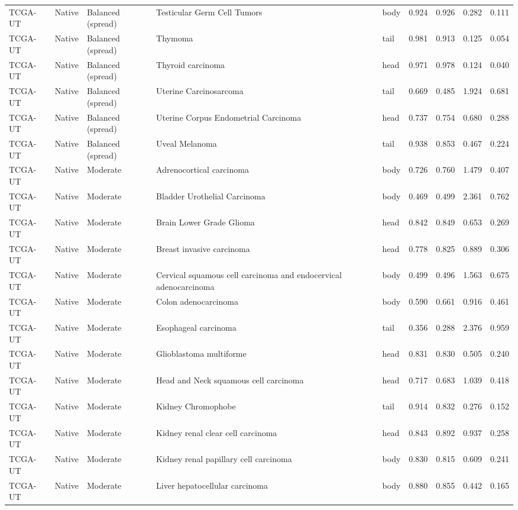 \begin{longtable}{lllllrrrr}
TCGA-UT & Native & Balanced (spread) & Testicular Germ Cell Tumors & body & 0.924 & 0.926 & 0.282 & 0.111 \\
TCGA-UT & Native & Balanced (spread) & Thymoma & tail & 0.981 & 0.913 & 0.125 & 0.054 \\
TCGA-UT & Native & Balanced (spread) & Thyroid carcinoma & head & 0.971 & 0.978 & 0.124 & 0.040 \\
TCGA-UT & Native & Balanced (spread) & Uterine Carcinosarcoma & tail & 0.669 & 0.485 & 1.924 & 0.681 \\
TCGA-UT & Native & Balanced (spread) & Uterine Corpus Endometrial Carcinoma & head & 0.737 & 0.754 & 0.680 & 0.288 \\
TCGA-UT & Native & Balanced (spread) & Uveal Melanoma & tail & 0.938 & 0.853 & 0.467 & 0.224 \\
TCGA-UT & Native & Moderate & Adrenocortical carcinoma & body & 0.726 & 0.760 & 1.479 & 0.407 \\
TCGA-UT & Native & Moderate & Bladder Urothelial Carcinoma & body & 0.469 & 0.499 & 2.361 & 0.762 \\
TCGA-UT & Native & Moderate & Brain Lower Grade Glioma & head & 0.842 & 0.849 & 0.653 & 0.269 \\
TCGA-UT & Native & Moderate & Breast invasive carcinoma & head & 0.778 & 0.825 & 0.889 & 0.306 \\
TCGA-UT & Native & Moderate & Cervical squamous cell carcinoma and endocervical adenocarcinoma & body & 0.499 & 0.496 & 1.563 & 0.675 \\
TCGA-UT & Native & Moderate & Colon adenocarcinoma & body & 0.590 & 0.661 & 0.916 & 0.461 \\
TCGA-UT & Native & Moderate & Esophageal carcinoma & tail & 0.356 & 0.288 & 2.376 & 0.959 \\
TCGA-UT & Native & Moderate & Glioblastoma multiforme & head & 0.831 & 0.830 & 0.505 & 0.240 \\
TCGA-UT & Native & Moderate & Head and Neck squamous cell carcinoma & head & 0.717 & 0.683 & 1.039 & 0.418 \\
TCGA-UT & Native & Moderate & Kidney Chromophobe & tail & 0.914 & 0.832 & 0.276 & 0.152 \\
TCGA-UT & Native & Moderate & Kidney renal clear cell carcinoma & head & 0.843 & 0.892 & 0.937 & 0.258 \\
TCGA-UT & Native & Moderate & Kidney renal papillary cell carcinoma & body & 0.830 & 0.815 & 0.609 & 0.241 \\
TCGA-UT & Native & Moderate & Liver hepatocellular carcinoma & body & 0.880 & 0.855 & 0.442 & 0.165 \\

\end{longtable}
